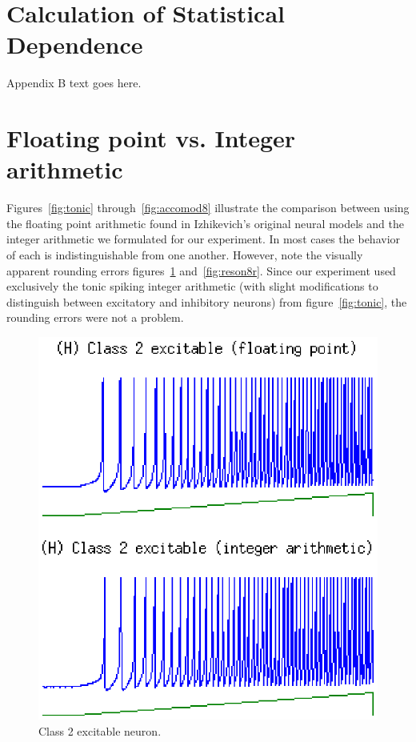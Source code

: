 \documentclass[journal]{./sty/IEEEtran}
\begin{document}
\section{Calculation of Statistical Dependence}
Appendix B text goes here.

\section{Floating point vs. Integer arithmetic}
Figures~\ref{fig:tonic} through~\ref{fig:accomod8} illustrate the comparison between using the floating point arithmetic found in Izhikevich's original neural models \cite{Spikes:Izhi} and the integer arithmetic we formulated for our experiment. In most cases the behavior of each is indistinguishable from one another. However, note the visually apparent rounding errors figures~\ref{fig:excit2} and~\ref{fig:reson8r}. Since our experiment used exclusively the tonic spiking integer arithmetic (with slight modifications to distinguish between excitatory and inhibitory neurons) from figure~\ref{fig:tonic}, the rounding errors were not a problem.

\begin{figure}
\centering
\includegraphics[scale=0.6]{imgs/izh_class_2_excitable}
\caption{Class 2 excitable neuron.\label{fig:excit2}}
\end{figure}
\end{document}
